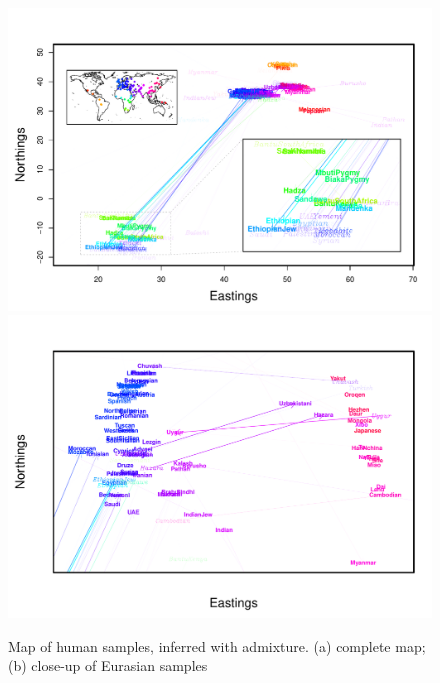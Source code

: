 \documentclass[12pt]{article}
\begin{document}
\begin{figure}
	\centering
			{\includegraphics[width=\textwidth,height=0.71\textwidth]{figs/globetrotter/globe_Ad_map_AfricaInset.pdf}}
			{\includegraphics[width=\textwidth,height=0.71\textwidth]{figs/globetrotter/eurasia_Ad_map_indproc.pdf}}
	\caption{Map of human samples, inferred with admixture. (a) complete map; (b) close-up of Eurasian samples}\label{sfig:globe_ad_maps}
\end{figure}
\end{document}
